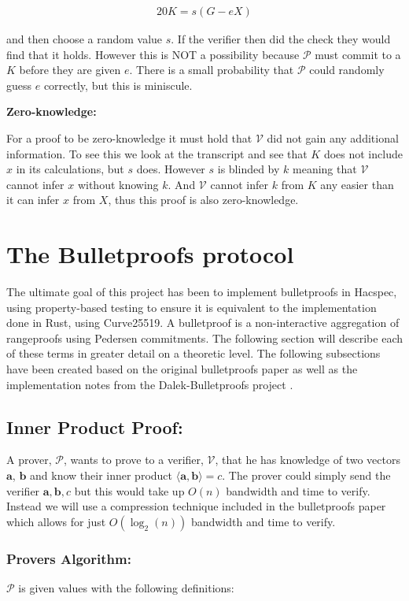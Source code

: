 \documentclass{article}
\newcommand{\eq}[1]{\begin{alignat*}{20}#1\end{alignat*}}
\renewcommand{\vec}[1]{\boldsymbol{#1}}
\newcommand{\V}{\mathcal{V}}
\renewcommand{\P}{\mathcal{P}}
\newcommand{\dotp}[2]{\langle #1, #2 \rangle}
\begin{document}
\eq{
	K = s(G - eX)
}

and then choose a random value $s$. If the verifier then did the check
they would find that it holds. However this is NOT a possibility
because $\P$ must commit to a $K$ before they are given $e$. There
is a small probability that $\P$ could randomly guess $e$ correctly,
but this is miniscule.

\textbf{Zero-knowledge:}

For a proof to be zero-knowledge it must hold that $\V$ did not gain
any additional information. To see this we look at the transcript
and see that $K$ does not include $x$ in its calculations, but $s$
does. However $s$ is blinded by $k$ meaning that $\V$ cannot infer $x$
without knowing $k$. And $\V$ cannot infer $k$ from $K$ any easier
than it can infer $x$ from $X$, thus this proof is also zero-knowledge.

\section{The Bulletproofs protocol} \label{Bulletproofs}

The ultimate goal of this project has been to implement bulletproofs
in Hacspec, using property-based testing to ensure it is equivalent to
the implementation done in Rust, using Curve25519. A bulletproof is a
non-interactive aggregation of rangeproofs using Pedersen commitments.
The following section will describe each of these terms in greater
detail on a theoretic level. The following subsections have been
created based on the original bulletproofs paper \cite{bulletproofs}
as well as the implementation notes from the Dalek-Bulletproofs project
\cite{dalek}.

\subsection{Inner Product Proof:}
A prover, $\P$, wants to prove to a verifier, $\V$, that he has
knowledge of two vectors $\vec{a}$, $\vec{b}$ and know their inner
product $\dotp{\vec{a}}{\vec{b}} = c$. The prover could simply send
the verifier $\vec{a}, \vec{b}, c$ but this would take up $O(n)$
bandwidth and time to verify. Instead we will use a compression
technique included in the bulletproofs paper which allows for just
$O(\log_2(n))$ bandwidth and time to verify.

\subsubsection{Provers Algorithm:}
$\P$ is given values with the following definitions:
\end{document}

